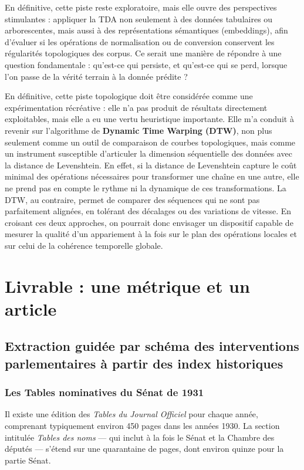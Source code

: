 En définitive, cette piste reste exploratoire, mais elle ouvre des perspectives stimulantes : appliquer la TDA non seulement à des données tabulaires ou arborescentes, mais aussi à des représentations sémantiques (embeddings), afin d’évaluer si les opérations de normalisation ou de conversion conservent les régularités topologiques des corpus. Ce serait une manière de répondre à une question fondamentale : qu’est-ce qui persiste, et qu’est-ce qui se perd, lorsque l’on passe de la vérité terrain à la donnée prédite ?

En définitive, cette piste topologique doit être considérée comme une expérimentation récréative : elle n’a pas produit de résultats directement exploitables, mais elle a eu une vertu heuristique importante. Elle m’a conduit à revenir sur l’algorithme de \textbf{Dynamic Time Warping (DTW)}, non plus seulement comme un outil de comparaison de courbes topologiques, mais comme un instrument susceptible d’articuler la dimension séquentielle des données avec la distance de Levenshtein. En effet, si la distance de Levenshtein capture le coût minimal des opérations nécessaires pour transformer une chaîne en une autre, elle ne prend pas en compte le rythme ni la dynamique de ces transformations. La DTW, au contraire, permet de comparer des séquences qui ne sont pas parfaitement alignées, en tolérant des décalages ou des variations de vitesse. En croisant ces deux approches, on pourrait donc envisager un dispositif capable de mesurer la qualité d’un appariement à la fois sur le plan des opérations locales et sur celui de la cohérence temporelle globale.

\chapter{Livrable : une métrique et un article}

\section{Extraction guidée par schéma des interventions parlementaires à partir des index historiques}

\subsection{Les Tables nominatives du Sénat de 1931}

Il existe une édition des \emph{Tables du Journal Officiel} pour chaque année, comprenant typiquement environ 450 pages dans les années 1930. La section intitulée \emph{Tables des noms} — qui inclut à la fois le Sénat et la Chambre des députés — s’étend sur une quarantaine de pages, dont environ quinze pour la partie Sénat.

